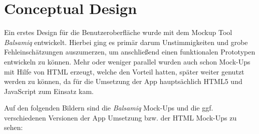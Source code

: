 \chapter{Conceptual Design}
Ein erstes Design für die Benutzeroberfläche wurde mit dem Mockup Tool \textit{Balsamiq} entwickelt. Hierbei ging es primär darum Unstimmigkeiten und grobe Fehleinschätzungen auszumerzen, um anschließend einen funktionalen Prototypen entwickeln zu können. Mehr oder weniger parallel wurden auch schon Mock-Ups mit Hilfe von HTML erzeugt, welche den Vorteil hatten, später weiter genutzt werden zu können, da für die Umsetzung der App hauptsächlich HTML5 und JavaScript zum Einsatz kam.

Auf den folgenden Bildern sind die \textit{Balsamiq} Mock-Ups und die ggf. verschiedenen Versionen der App Umsetzung bzw. der HTML Mock-Ups zu sehen:

